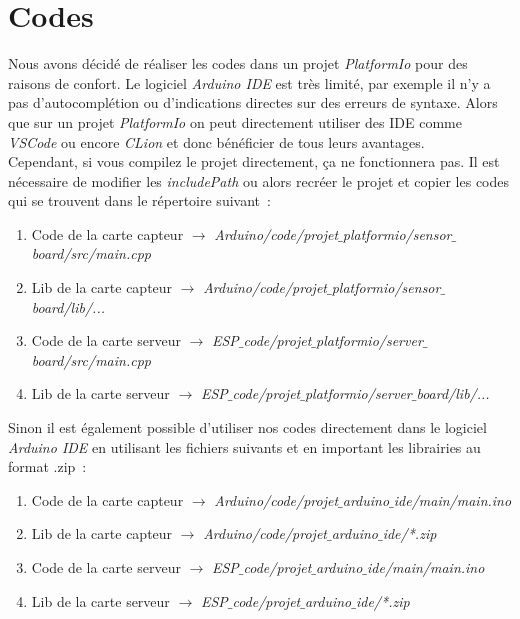 \chapter{Codes}
    Nous avons décidé de réaliser les codes dans un projet \textit{PlatformIo} pour des raisons de confort. Le logiciel \textit{Arduino IDE} est très limité, par exemple il n'y a pas d'autocomplétion ou d'indications directes sur des erreurs de syntaxe.
    Alors que sur un projet \textit{PlatformIo} on peut directement utiliser des IDE comme \textit{VSCode} ou encore \textit{CLion} et donc bénéficier de tous leurs avantages. \\
    Cependant, si vous compilez le projet directement, ça ne fonctionnera pas. Il est nécessaire de modifier les \textit{includePath} ou alors recréer le projet et copier les codes qui se trouvent dans le répertoire suivant~:

    \begin{enumerate}
        \item Code de la carte capteur $\to$ \textit{Arduino/code/projet$\_$platformio/sensor$\_$board/src/main.cpp}
        \item Lib de la carte capteur $\to$ \textit{Arduino/code/projet$\_$platformio/sensor$\_$board/lib/...}
        \item Code de la carte serveur $\to$ \textit{ESP$\_$code/projet$\_$platformio/server$\_$board/src/main.cpp}
        \item Lib de la carte serveur $\to$ \textit{ESP$\_$code/projet$\_$platformio/server$\_$board/lib/...}
    \end{enumerate}

    \vspace{0.2 cm}

    \noindent
    Sinon il est également possible d'utiliser nos codes directement dans le logiciel \textit{Arduino IDE} en utilisant les fichiers suivants et en important les librairies au format .zip~:

    \begin{enumerate}
        \item Code de la carte capteur $\to$ \textit{Arduino/code/projet$\_$arduino$\_$ide/main/main.ino}
        \item Lib de la carte capteur $\to$ \textit{Arduino/code/projet$\_$arduino$\_$ide/*.zip}
        \item Code de la carte serveur $\to$ \textit{ESP$\_$code/projet$\_$arduino$\_$ide/main/main.ino}
        \item Lib de la carte serveur $\to$ \textit{ESP$\_$code/projet$\_$arduino$\_$ide/*.zip}
    \end{enumerate}


